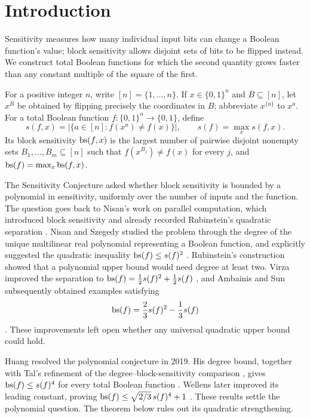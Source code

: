 \section{Introduction}
\label{sec:introduction}

Sensitivity measures how many individual input bits can change a Boolean
function's value; block sensitivity allows disjoint sets of bits to be
flipped instead. We construct total Boolean functions for which the second
quantity grows faster than any constant multiple of the square of the first.

For a positive integer \(n\), write \([n]=\{1,\ldots,n\}\).
If \(x\in\{0,1\}^n\) and \(B\subseteq[n]\), let \(x^B\) be obtained
by flipping precisely the coordinates in \(B\); abbreviate
\(x^{\{a\}}\) to \(x^a\).
For a total Boolean function \(f:\{0,1\}^n\to\{0,1\}\), define
\[
 s(f,x)=\bigl|\{a\in[n]:f(x^a)\ne f(x)\}\bigr|,
 \qquad s(f)=\max_x s(f,x).
\]
Its block sensitivity \(\operatorname{bs}(f,x)\) is the largest number of pairwise
disjoint nonempty sets \(B_1,\ldots,B_m\subseteq[n]\) such that
\(f(x^{B_j})\ne f(x)\) for every \(j\), and
\(\operatorname{bs}(f)=\max_x\operatorname{bs}(f,x)\).

The Sensitivity Conjecture asked whether block sensitivity is bounded by a
polynomial in sensitivity, uniformly over the number of inputs and the
function. The question goes back to Nisan's work on parallel computation,
which introduced block sensitivity and already recorded Rubinstein's
quadratic separation \cite[Section~2]{Nisan1989}.
Nisan and Szegedy studied the problem through the degree of the unique
multilinear real polynomial representing a Boolean function, and explicitly
suggested the quadratic inequality \(\operatorname{bs}(f)\le s(f)^2\)
\cite[Section~4]{NisanSzegedy1994}.
Rubinstein's construction \cite{Rubinstein1995} showed that a polynomial
upper bound would need degree at least two. Virza improved the separation
to \(\operatorname{bs}(f)=\tfrac12s(f)^2+\tfrac12s(f)\) \cite{Virza2011}, and
Ambainis and Sun subsequently obtained examples satisfying
\[
 \operatorname{bs}(f)=\frac23s(f)^2-\frac13s(f)
\]
\cite[Theorem~1]{AmbainisSun2011}.
These improvements left open whether any universal quadratic upper bound
could hold.

Huang resolved the polynomial conjecture in 2019. His degree bound,
together with Tal's refinement of the degree--block-sensitivity comparison
\cite{Tal2013}, gives \(\operatorname{bs}(f)\le s(f)^4\) for every total Boolean function
\cite[Theorem~1.5]{Huang2019}. Wellens later improved its leading constant,
proving
\(\operatorname{bs}(f)\le\sqrt{2/3}\,s(f)^4+1\)
\cite[Corollary~4.2]{Wellens2022}.
These results settle the polynomial question. The theorem below rules out
its quadratic strengthening.

